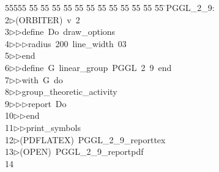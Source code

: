 %
%
\begin{tabbing}
55555 \= 55 \= 55 \= 55 \= 55 \= 55 \= 55 \= 55 \= 55 \= 55 \= 55 \= 55 \= 55 \= \>PGGL\_2\_9:\\[0pt]
2\>$\triangleright$\>(ORBITER)\ v\ 2\ \\[0pt]
3\>$\triangleright$\>$\triangleright$\>define\ Do\ draw\_options\ \\[0pt]
4\>$\triangleright$\>$\triangleright$\>$\triangleright$\>radius\ 200\ line\_width\ 03\ \\[0pt]
5\>$\triangleright$\>$\triangleright$\>end\ \\[0pt]
6\>$\triangleright$\>$\triangleright$\>define\ G\ linear\_group\ PGGL\ 2\ 9\ end\ \\[0pt]
7\>$\triangleright$\>$\triangleright$\>with\ G\ do\ \\[0pt]
8\>$\triangleright$\>$\triangleright$\>group\_theoretic\_activity\ \\[0pt]
9\>$\triangleright$\>$\triangleright$\>$\triangleright$\>report\ Do\ \\[0pt]
10\>$\triangleright$\>$\triangleright$\>end\ \\[0pt]
11\>$\triangleright$\>$\triangleright$\>print\_symbols\\[0pt]
12\>$\triangleright$\>(PDFLATEX)\ PGGL\_2\_9\_reporttex\\[0pt]
13\>$\triangleright$\>(OPEN)\ PGGL\_2\_9\_reportpdf\\[0pt]
14\>\end{tabbing}
